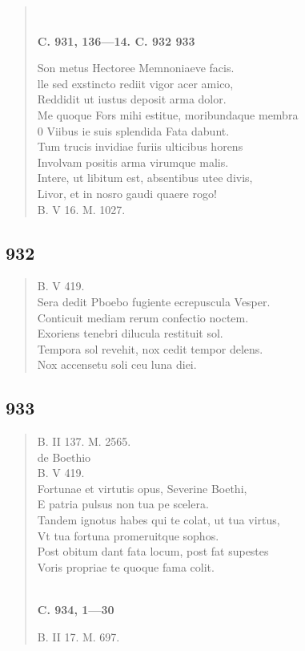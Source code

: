 \documentclass[11pt, a4paper]{report}
\begin{document}
\begin{verse}
        ﻿\pagebreak 
    \begin{center} \textbf{C. 931, 136—14. C. 932 933} \end{center} \marginpar{[357]} Son metus Hectoree Memnoniaeve facis. \\ lle sed exstincto rediit vigor acer amico, \\ Reddidit ut iustus deposit arma dolor. \\ Me quoque Fors mihi estitue, moribundaque membra \\ 0 Viibus ie suis splendida Fata dabunt. \\ Tum trucis invidiae furiis ulticibus horens \\ Involvam positis arma virumque malis. \\ Intere, ut libitum est, absentibus utee divis, \\ Livor, et in nosro gaudi quaere rogo! \\ B. V 16. M. 1027. \\ 
      \end{verse}
  
            \subsection*{932}
      \begin{verse}
      B. V 419. \\ Sera dedit Pboebo fugiente ecrepuscula Vesper. \\ Conticuit mediam rerum confectio noctem. \\ Exoriens tenebri dilucula restituit sol. \\ Tempora sol revehit, nox cedit tempor delens. \\ Nox accensetu soli ceu luna diei. \\ 
      \end{verse}
  
            \subsection*{933}
      \begin{verse}
      B. II 137. M. 2565. \\ de Boethio \\ B. V 419. \\ Fortunae et virtutis opus, Severine Boethi, \\ E patria pulsus non tua pe scelera. \\ Tandem ignotus habes qui te colat, ut tua virtus, \\ Vt tua fortuna promeruitque sophos. \\ Post obitum dant fata locum, post fat supestes \\ Voris propriae te quoque fama colit. \\ 
        ﻿\pagebreak 
    \begin{center} \textbf{C. 934, 1—30} \end{center} \marginpar{[358]} B. II 17. M. 697. \\ 
      \end{verse}
  
\end{document}
